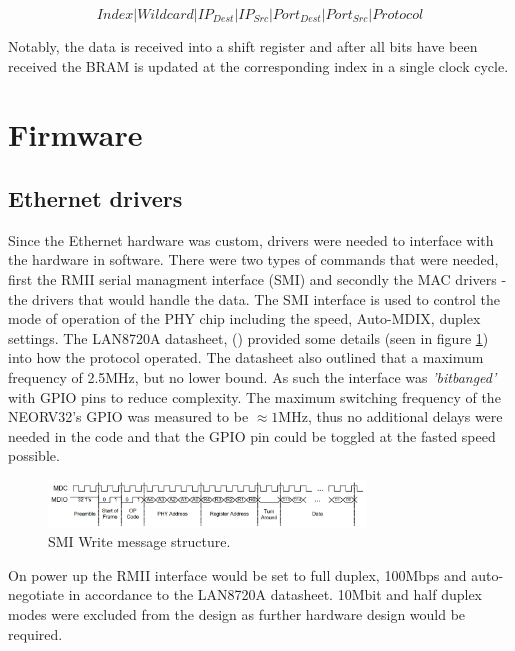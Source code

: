 \[
Index | Wildcard | IP_{Dest} |  IP_{Src}  | Port_{Dest} |  Port_{Src} | Protocol
\]


Notably, the data is received into a shift register and after all bits have been received the BRAM is updated at the corresponding index in a single clock cycle.








\section{Firmware}
\subsection{Ethernet drivers}
\label{sec:ethernet_mac_driver}

Since the Ethernet hardware was custom, drivers were needed to interface with the hardware in software. There were two types of commands that were needed, first the RMII serial managment interface (SMI) and secondly the MAC drivers - the drivers that would handle the data.  The SMI interface is used to control the mode of operation of the PHY chip including the speed, Auto-MDIX, duplex settings. The LAN8720A datasheet, (\cite{LAN8720ADatasheet}) provided some details (seen in figure \ref{fig:smi_packet_structure}) into how the protocol operated. The datasheet also outlined that a maximum frequency of 2.5MHz, but no lower bound. As such the interface was \textit{'bitbanged'} with GPIO pins to reduce complexity. The maximum switching frequency of the NEORV32's GPIO was measured to be $\approx 1$MHz, thus no additional delays were needed in the code and that the GPIO pin could be toggled at the fasted speed possible. 


\begin{figure}[h!]
    \centering
    \includegraphics[width=0.75\textwidth]{Images/SMIWriteStructure.png}
    \caption[SMI Write message structure]{SMI Write message structure. \cite{LAN8720ADatasheet}}
    \label{fig:smi_packet_structure}
\end{figure}

On power up the RMII interface would be set to full duplex, 100Mbps and auto-negotiate in accordance to the LAN8720A datasheet. 10Mbit and half duplex modes were excluded from the design as further hardware design would be required.  


